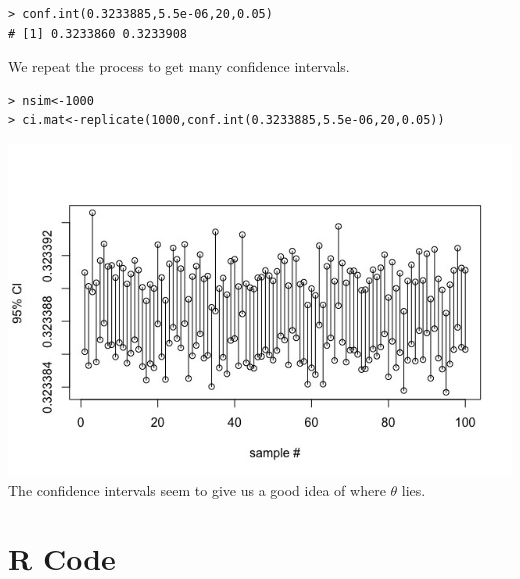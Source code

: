 \documentclass[12pt,letterpaper,titlepage,en-US]{article}
\begin{document}
\begin{knitrout}
\color{fgcolor}
\begin{kframe}
\begin{verbatim}
> conf.int(0.3233885,5.5e-06,20,0.05)
# [1] 0.3233860 0.3233908
\end{verbatim}
\end{kframe}
\end{knitrout}


We repeat the process to get many confidence intervals.
\begin{knitrout}
\color{fgcolor}
\begin{kframe}
\begin{verbatim}
> nsim<-1000
> ci.mat<-replicate(1000,conf.int(0.3233885,5.5e-06,20,0.05))
\end{verbatim}
\end{kframe}
\end{knitrout}

\includegraphics[scale=0.6]{ci.jpeg}\\
The confidence intervals seem to give us a good idea of where $\theta$ lies.
\section{R Code}


\end{document}
